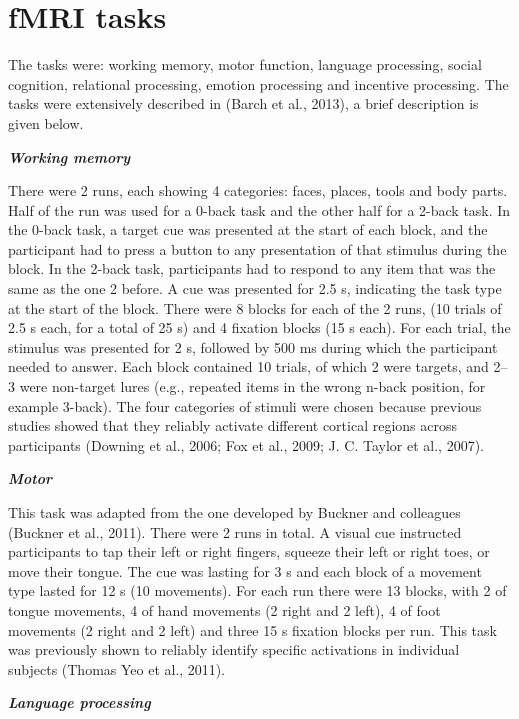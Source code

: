 \documentclass[11pt]{article}
\begin{document}
\section{fMRI tasks}

The tasks were: working memory, motor function, language processing,
social cognition, relational processing, emotion processing and
incentive processing. The tasks were extensively described in (Barch et
al., 2013), a brief description is given below.

\textbf{\emph{Working memory}}

There were 2 runs, each showing 4 categories: faces, places, tools and
body parts. Half of the run was used for a 0-back task and the other
half for a 2-back task. In the 0-back task, a target cue was presented
at the start of each block, and the participant had to press a button to
any presentation of that stimulus during the block. In the 2-back task,
participants had to respond to any item that was the same as the one 2
before. A cue was presented for 2.5 s, indicating the task type at the
start of the block. There were 8 blocks for each of the 2 runs, (10
trials of 2.5 s each, for a total of 25 s) and 4 fixation blocks (15 s
each). For each trial, the stimulus was presented for 2 s, followed by
500 ms during which the participant needed to answer. Each block
contained 10 trials, of which 2 were targets, and 2--3 were non-target
lures (e.g., repeated items in the wrong n-back position, for example
3-back). The four categories of stimuli were chosen because previous
studies showed that they reliably activate different cortical regions
across participants (Downing et al., 2006; Fox et al., 2009; J. C.
Taylor et al., 2007).

\textbf{\emph{Motor}}

This task was adapted from the one developed by Buckner and colleagues
(Buckner et al., 2011). There were 2 runs in total. A visual cue
instructed participants to tap their left or right fingers, squeeze
their left or right toes, or move their tongue. The cue was lasting for
3 s and each block of a movement type lasted for 12 s (10 movements).
For each run there were 13 blocks, with 2 of tongue movements, 4 of hand
movements (2 right and 2 left), 4 of foot movements (2 right and 2 left)
and three 15 s fixation blocks per run. This task was previously shown
to reliably identify specific activations in individual subjects (Thomas
Yeo et al., 2011).

\textbf{\emph{Language processing}}
\end{document}
